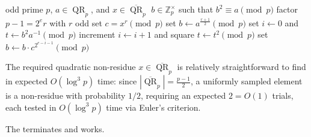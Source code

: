 \begin{algorithm}[htbp]
    \caption{Tonelli--Shanks Algorithm}\label{alg:modular-square-root}
    \begin{algorithmic}[1]
        \Require odd prime \(p\), \(a \in \operatorname{QR}_p\), and \(x \in \overline{\operatorname{QR}}_p\)
        \Ensure \(b \in \mathbb{Z}_p^\times\) such that \(b^2 \equiv a \pmod{p}\)
        \State factor \(p - 1 = 2^e r\) with \(r\) odd
        \State set \(c = x^r \pmod{p}\) 
        \State set \(b \gets a^{\frac{r+1}{2}} \pmod{p}\) 
         \label{alg:modular-square-root:outer-loop}
            \State set \(i \gets 0\) and \(t \gets b^2 a^{-1} \pmod{p}\)
            \Repeat \label{alg:modular-square-root:inner-loop}
                \State increment \(i \gets i + 1\) and square \(t \gets t^2 \pmod{p}\)
             
            \State set \(b \gets b \cdot c^{2^{e-i-1}} \pmod{p}\) \label{alg:modular-square-root:update-b} 
        \EndWhile
    \end{algorithmic}
\end{algorithm}

\begin{remark}
    The required quadratic non-residue \(x \in \overline{\operatorname{QR}}_p\) is relatively straightforward to find in expected \(O(\log^3 p)\) time: since \(|\overline{\operatorname{QR}}_p| = \frac{p-1}{2}\), a uniformly sampled element is a non-residue with probability \(1/2\), requiring an expected \(2 = O(1)\) trials, each tested in \(O(\log^3 p)\) time via Euler's criterion.
\end{remark}

\begin{theorem}
    The  terminates and works.
\end{theorem}

